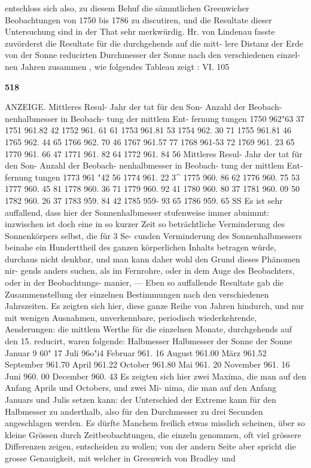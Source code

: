 \documentclass[12pt,a4paper]{article}
\begin{document}
entschloss  sich  also,  zu  diesem  Behuf  die  sämmtlichen  Greenwicher Beobachtungen  von  1750  bis  1786  zu  discutiren,  und  die  Resultate  dieser  Untersuchung  sind  in  der  That sehr  merkwürdig.  Hr.  von  Lindenau  fasste  zuvörderst  die  Resultate  für  die  durchgehends  auf  die  mitt- lere Distanz  der  Erde  von  der  Sonne  reducirten  Durchmesser  der  Sonne  nach  den  verschiedenen  einzel- nen Jahren  zusammen ,  wie  folgendes  Tableau  zeigt : VI. 105

\vspace{0.5em}


\noindent\textbf{518}

ANZEIGE. Mittleres  Resul- Jahr der tat  für  den  Son- Anzahl der Beobach- nenhalbmesser in Beobach- tung der  mittlem  Ent- fernung tungen 1750 962"63 37 1751 961.82 42 1752 961.  61 61 1753 961.81 53 1754 962. 30 71 1755 961.81 46 1765 962.  44 65 1766 962.  70 46 1767 961.57 77 1768 961-53 72 1769 961.  23 65 1770 961. 66 47 1771 961.  82 64 1772 961. 84 56 Mittleres  Resul- Jahr der tat  für  den  Son- Anzahl der Beobach- nenhalbmesser in Beobach- tung der  mittlem  Ent- fernung tungen 1773 961 "42 56 1774 961.  22 3\textasciicircum{} 1775 960.  86 62 1776 960.  75 53 1777 960.  45 81 1778 960.  36 71 1779 960. 92 41 1780 960.  80 37 1781 960.  09 50 1782 960. 26 37 1783 959. 84 42 1785 959-  93 65 1786 959.  65 SS Es  ist  sehr  auffallend,  dass  hier  der  Sonnenhalbmesser  stufenweise  immer  abnimmt:  inzwischen ist  doch  eine  in  so  kurzer  Zeit  so  beträchtliche  Verminderung  des  Sonnenkörpers  selbst,  die  für  3  Se- cunden  Verminderung  des  Sonnenhalbmessers  beinahe  ein  Hunderttheil  des  ganzen  körperlichen  Inhalts betragen  würde,  durchaus  nicht  denkbar,  und  man  kann  daher  wohl  den  Grund  dieses  Phänomen  nir- gends anders  suchen,  als  im  Fernrohre,  oder  in  dem  Auge  des  Beobachters,  oder  in  der  Beobachtungs- manier, ---  Eben  so  auffallende  Resultate  gab  die  Zusammenstellung  der  einzelnen  Bestimmungen  nach den  verschiedenen  Jahrszeiten.  Es  zeigten  sich  hier,  diese  ganze  Reihe  von  Jahren  hindurch,  und  nur mit  wenigen  Ausnahmen,  unverkennbare,  periodisch  wiederkehrende,  Aenderungen:  die  mittlem  Werthe für  die  einzelnen  Monate,  durchgehends  auf  den  15.  reducirt,  waren  folgende: Halbmesser Halbmesser der  Sonne der  Sonne Januar 9 60" 17 Juli 96o"i4 Februar 961. 16 August 961.00 März 961.52 September 961.70 April 961.22 October 961.80 Mai 961.  20 November 961. 16 Juni 960. 00 December 960. 43 Es  zeigten  sich  hier  zwei  Maxima,  die  man  auf  den  Anfang  Aprils  und  Octobers,  und  zwei  Mi- nima, die  man  auf  den  Anfang  Januars  und  Julis  setzen  kann:  der  Unterschied  der  Extreme  kann  für den  Halbmesser  zu  anderthalb,  also  für  den  Durchmesser  zu  drei  Secunden  angeschlagen  werden.  Es dürfte  Manchem  freilich  etwas  misslich  scheinen,  über  so  kleine  Grössen  durch  Zeitbeobachtungen,  die einzeln  genommen,  oft  viel  grössere  Differenzen  zeigen,  entscheiden  zu  wollen;  von  der  andern  Seite aber  spricht  die  grosse  Genauigkeit,  mit  welcher  in  Greenwich  von  Bradley  und  
\end{document}
